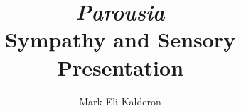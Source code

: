 \documentclass[12pt]{book}
\newcommand\myauthor{Mark Eli Kalderon}
\begin{document}
\author{\myauthor}
\title{\emph{Parousia}\\
Sympathy and Sensory Presentation}
\date{}

\maketitle
{}
\frontmatter
% 
\tableofcontents



\mainmatter









\backmatter


\nocite{Hamlyn:2002ys}
\nocite{Ross:1906fk}
\nocite{Ross:1961uq}
\nocite{Ross:1924aa}

 


\end{document}
